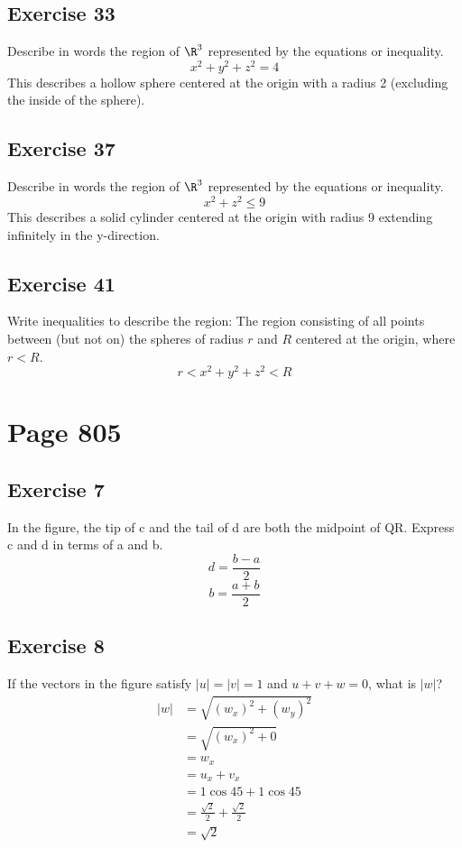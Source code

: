 \documentclass{math}
\begin{document}
\subsection*{Exercise 33}
Describe in words the region of \( \R^3 \) represented by the equations or
inequality.
\[ x^2+y^2+z^2 = 4 \]
This describes a hollow sphere centered at the origin with a radius 2 (excluding
the inside of the sphere).

\subsection*{Exercise 37}
Describe in words the region of \( \R^3 \) represented by the equations or
inequality.
\[ x^2+z^2\le 9 \]
This describes a solid cylinder centered at the origin with radius 9 extending
infinitely in the y-direction.

\subsection*{Exercise 41}
Write inequalities to describe the region: The region consisting of all points
between (but not on) the spheres of radius \( r \) and \( R \) centered at the
origin, where \( r < R \).
\[ r < x^2+y^2+z^2 < R \]

\section*{Page 805}

\subsection*{Exercise 7}
In the figure, the tip of c and the tail of d are both the midpoint
of QR. Express c and d in terms of a and b.
\[ d = \frac{b-a}{2} \]
\[ b = \frac{a+b}{2} \]

\subsection*{Exercise 8}
If the vectors in the figure satisfy \( |u| = |v|= 1 \) and \( u+v+w = 0 \),
what is \( |w| \)?
\begin{align*}
  |w| &= \sqrt{(w_x)^2+(w_y)^2} \\
  &= \sqrt{(w_x)^2+0} \\
  &= w_x \\
  &= u_x+v_x \\
  &= 1\cos45+1\cos45 \\
  &= \frac{\sqrt{2}}{2}+\frac{\sqrt{2}}{2} \\
  &= \sqrt{2}
\end{align*}
\end{document}
